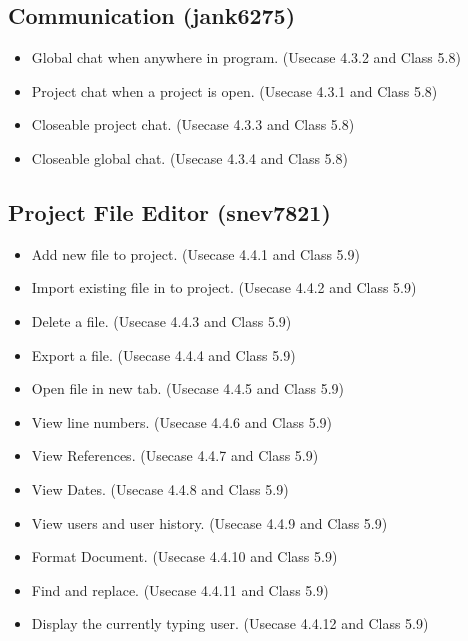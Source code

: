 \documentclass[11pt]{report}
\begin{document}
    \subsection{Communication (jank6275)}
        \begin{itemize}
            \item Global chat when anywhere in program. (Usecase 4.3.2 and Class 5.8)
            \item Project chat when a project is open. (Usecase 4.3.1 and Class 5.8)
            \item Closeable project chat. (Usecase 4.3.3 and Class 5.8)
            \item Closeable global chat. (Usecase 4.3.4 and Class 5.8)
        \end{itemize}
   \subsection{Project File Editor (snev7821)}
        \begin{itemize}
            \item Add new file to project. (Usecase 4.4.1 and Class 5.9)
            \item Import existing file in to project. (Usecase 4.4.2 and Class 5.9)
            \item Delete a file. (Usecase 4.4.3 and Class 5.9)
            \item Export a file. (Usecase 4.4.4 and Class 5.9)
            \item Open file in new tab. (Usecase 4.4.5 and Class 5.9)
            \item View line numbers. (Usecase 4.4.6 and Class 5.9)
            \item View References. (Usecase 4.4.7 and Class 5.9)
            \item View Dates. (Usecase 4.4.8 and Class 5.9)
            \item View users and user history. (Usecase 4.4.9 and Class 5.9)
            \item Format Document. (Usecase 4.4.10 and Class 5.9)
            \item Find and replace. (Usecase 4.4.11 and Class 5.9)
            \item Display the currently typing user. (Usecase 4.4.12 and Class 5.9)
        \end{itemize}
\end{document}
